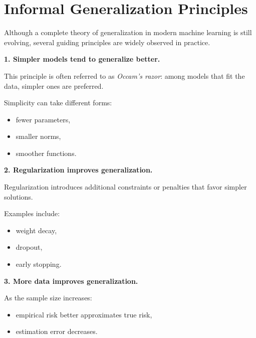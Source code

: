 \section{Informal Generalization Principles}

Although a complete theory of generalization in modern machine learning is still evolving, several guiding principles are widely observed in practice.

\medskip

\noindent
\textbf{1. Simpler models tend to generalize better.}

\medskip

\noindent
This principle is often referred to as \emph{Occam's razor}: among models that fit the data, simpler ones are preferred.

\medskip

\noindent
Simplicity can take different forms:
\begin{itemize}
    \item fewer parameters,
    \item smaller norms,
    \item smoother functions.
\end{itemize}

\medskip

\noindent
\textbf{2. Regularization improves generalization.}

\medskip

\noindent
Regularization introduces additional constraints or penalties that favor simpler solutions.

\medskip

\noindent
Examples include:
\begin{itemize}
    \item weight decay,
    \item dropout,
    \item early stopping.
\end{itemize}

\medskip

\noindent
\textbf{3. More data improves generalization.}

\medskip

\noindent
As the sample size increases:
\begin{itemize}
    \item empirical risk better approximates true risk,
    \item estimation error decreases.
\end{itemize}

\medskip

